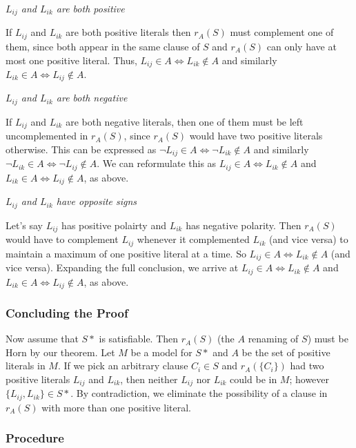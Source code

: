 \documentclass{article}
\begin{document}
\medskip
\noindent \emph{$L_{ij}$ and $L_{ik}$ are both positive}

\medskip
\noindent If $L_{ij}$ and $L_{ik}$ are both positive literals then $r_A(S)$ must complement one of them, since both appear in the same clause of $S$ and $r_A(S)$ can only have at most one positive literal. Thus, $L_{ij} \in A \iff L_{ik} \notin A$ and similarly $L_{ik} \in A \iff L_{ij} \notin A$.

\medskip
\noindent \emph{$L_{ij}$ and $L_{ik}$ are both negative}

\medskip
\noindent If $L_{ij}$ and $L_{ik}$ are both negative literals, then one of them must be left uncomplemented in $r_A(S)$, since $r_A(S)$ would have two positive literals otherwise. This can be expressed as $\lnot L_{ij} \in A \iff \lnot L_{ik} \notin A$ and similarly $\lnot L_{ik} \in A \iff \lnot L_{ij} \notin A$. We can reformulate this as $L_{ij} \in A \iff L_{ik} \notin A$ and $L_{ik} \in A \iff L_{ij} \notin A$, as above.

\medskip
\noindent \emph{$L_{ij}$ and $L_{ik}$ have opposite signs}

\medskip
\noindent Let's say $L_{ij}$ has positive polairty and $L_{ik}$ has negative polarity. Then $r_A(S)$ would have to complement $L_{ij}$ whenever it complemented $L_{ik}$ (and vice versa) to maintain a maximum of one positive literal at a time. So $L_{ij} \in A \iff L_{ik} \notin A$ (and vice versa). Expanding the full conclusion, we arrive at $L_{ij} \in A \iff L_{ik} \notin A$ and $L_{ik} \in A \iff L_{ij} \notin A$, as above.

\subsubsection{Concluding the Proof}

\noindent Now assume that $S*$ is satisfiable. Then $r_A(S)$ (the $A$ renaming of $S$) must be Horn by our theorem. Let $M$ be a model for $S*$ and $A$ be the set of positive literals in $M$. If we pick an arbitrary clause $C_i \in S$ and $r_A(\{C_i\})$ had two positive literals $L_{ij}$ and $L_{ik}$, then neither $L_{ij}$ nor $L_{ik}$ could be in $M$; however $\{L_{ij}, L_{ik}\} \in S*$. By contradiction, we eliminate the possibility of a clause in $r_A(S)$ with more than one positive literal.

\subsubsection{Procedure}
\end{document}
